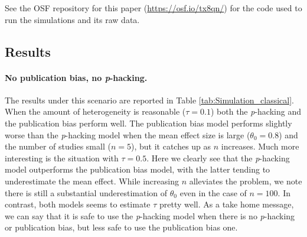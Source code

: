\documentclass{article}
\theoremstyle{plain}
\theoremstyle{definition}
\begin{document}
See the OSF repository for this paper (\url{https://osf.io/tx8qn/}) for the code used to run the simulations and its raw data.

\subsection{Results}
\paragraph{No publication bias, no \textit{p}-hacking.} The results under this scenario are reported in Table \ref{tab:Simulation_classical}. When the amount of heterogeneity is reasonable ($\tau = 0.1$) both the \textit{p}-hacking and the publication bias perform well. The publication bias model performs slightly worse than the \textit{p}-hacking model when the mean effect size is large ($\theta_0 = 0.8$) and the number of studies small ($n=5$), but it catches up as $n$ increases. Much more interesting is the situation with $\tau = 0.5$. Here we clearly see that the \textit{p}-hacking model outperforms the publication bias model, with the latter tending to underestimate the mean effect. While increasing $n$ alleviates the problem, we note there is still a substantial underestimation of $\theta_0$ even in the case of $n = 100$. In contrast, both models seems to estimate $\tau$ pretty well. As a take home message, we can say that it is safe to use the \textit{p}-hacking model when there is no \textit{p}-hacking or publication bias, but less safe to use the publication bias one.
\end{document}
